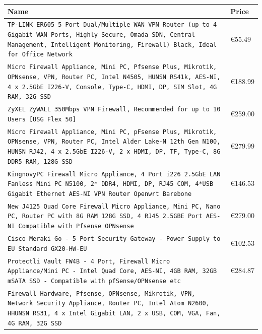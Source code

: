 \documentclass[mscthesis]{usiinfthesis}
\begin{document}

\begin{table}[H]
  \begin{tabular}{|p{113mm}|p{12mm}|}
    \hline
    Name & Price   \\
    \hline
    \rowcolor[gray]{0.8} \texttt{TP-LINK ER605 5 Port Dual/Multiple WAN VPN Router (up to 4 Gigabit WAN Ports, Highly Secure, Omada SDN, Central Management, Intelligent Monitoring, Firewall) Black, Ideal for Office Network
    }    & €55.49  \\
    \texttt{Micro Firewall Appliance, Mini PC, Pfsense Plus, Mikrotik, OPNsense, VPN, Router PC, Intel N4505, HUNSN RS41k, AES-NI, 4 x 2.5GbE I226-V, Console, Type-C, HDMI, DP, SIM Slot, 4G RAM, 32G SSD
    }    & €188.99 \\
    \rowcolor[gray]{0.8} \texttt{ZyXEL ZyWALL 350Mbps VPN Firewall, Recommended for up to 10 Users [USG Flex 50]
    }    & €259.00 \\
    \texttt{Micro Firewall Appliance, Mini PC, pFsense Plus, Mikrotik, OPNsense, VPN, Router PC, Intel Alder Lake-N 12th Gen N100, HUNSN RJ42, 4 x 2.5GbE I226-V, 2 x HDMI, DP, TF, Type-C, 8G DDR5 RAM, 128G SSD
    }    & €279.99 \\
    \rowcolor[gray]{0.8} \texttt{KingnovyPC Firewall Micro Appliance, 4 Port i226 2.5GbE LAN Fanless Mini PC N5100, 2* DDR4, HDMI, DP, RJ45 COM, 4*USB Gigabit Ethernet AES-NI VPN Router Openwrt Barebone
    }    & €146.53 \\
    \texttt{New J4125 Quad Core Firewall Micro Appliance, Mini PC, Nano PC, Router PC with 8G RAM 128G SSD, 4 RJ45 2.5GBE Port AES-NI Compatible with Pfsense OPNsense
    }    & €279.00 \\
    \rowcolor[gray]{0.8} \texttt{Cisco Meraki Go - 5 Port Security Gateway - Power Supply to EU Standard GX20-HW-EU
    }    & €102.53 \\
    \texttt{Protectli Vault FW4B - 4 Port, Firewall Micro Appliance/Mini PC - Intel Quad Core, AES-NI, 4GB RAM, 32GB mSATA SSD - Compatible with pfSense/OPNsense etc
    }    & €284.87 \\
    \rowcolor[gray]{0.8} \texttt{Firewall Hardware, Pfsense, OPNsense, Mikrotik, VPN, Network Security Appliance, Router PC, Intel Atom N2600, HHUNSN RS31, 4 x Intel Gigabit LAN, 2 x USB, COM, VGA, Fan, 4G RAM, 32G SSD
}
\end{tabular}
\end{table}
\end{document}

